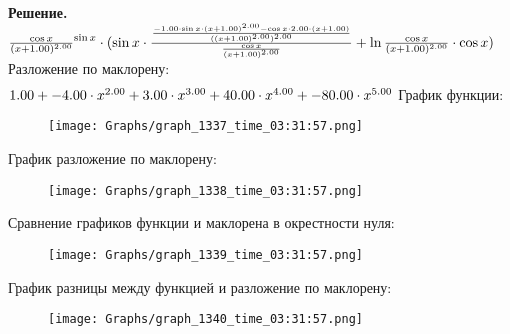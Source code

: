 \documentclass[12pt,a4paper]{extreport}
\theoremstyle{plain}
\theoremstyle{definition}
\newenvironment{solution}%
{\par\noindent\textbf{Решение. }}%
{\bigskip}
\begin{document}
\begin{solution}
\begin{math}
\frac {\cos x }{(x + 1.00 )^ {2.00 }}^ {\sin x }\cdot (\sin x \cdot \frac {\frac {-1.00 \cdot \sin x \cdot (x + 1.00 )^ {2.00 }- \cos x \cdot 2.00 \cdot (x + 1.00 )}{((x + 1.00 )^ {2.00 })^ {2.00 }}}{\frac {\cos x }{(x + 1.00 )^ {2.00 }}}+ \ln \frac {\cos x }{(x + 1.00 )^ {2.00 }}\cdot \cos x )\\
\end{math}
Разложение по маклорену: 
\begin{gather}
\end{gather}
\begin{math}
1.00 + -4.00 \cdot x ^ {2.00 }+ 3.00 \cdot x ^ {3.00 }+ 40.00 \cdot x ^ {4.00 }+ -80.00 \cdot x ^ {5.00 }\\
\end{math}
График функции:

\begin{figure}[H]
\centering
\texttt{[image: Graphs/graph\_1337\_time\_03:31:57.png]}
\end{figure}
График разложение по маклорену:

\begin{figure}[H]
\centering
\texttt{[image: Graphs/graph\_1338\_time\_03:31:57.png]}
\end{figure}
Сравнение графиков функции и маклорена в окрестности нуля:

\begin{figure}[H]
\centering
\texttt{[image: Graphs/graph\_1339\_time\_03:31:57.png]}
\end{figure}
График разницы между функцией и разложение по маклорену:

\begin{figure}[H]
\centering
\texttt{[image: Graphs/graph\_1340\_time\_03:31:57.png]}
\end{figure}
\end{solution}
\end{document}
